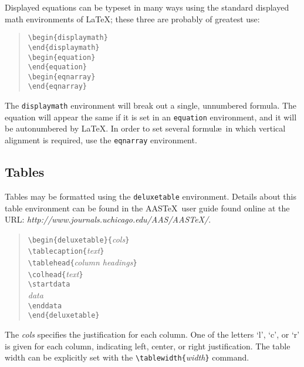 \documentclass[11pt,twoside]{article}
\def\arg#1{{\it#1\/}}
\begin{document}
Displayed equations can be typeset in many ways using the standard
displayed math environments of \LaTeX;
these three are probably of greatest use:
\begin{quote}
\verb+\begin{displaymath}+\\
\verb+\end{displaymath}+\\[.5ex]
\verb+\begin{equation}+\\
\verb+\end{equation}+\\[.5ex]
\verb+\begin{eqnarray}+\\
\verb+\end{eqnarray}+
\end{quote}
The \verb+displaymath+ environment will break out a single, unnumbered
formula.  The equation will appear the same if it is set in an
\verb+equation+ environment, and it will be autonumbered by \LaTeX.
In order to set several formul\ae\ in which vertical alignment is
required, use the \verb+eqnarray+ environment.

\subsection{Tables}

Tables may be formatted using the \verb+deluxetable+ environment.  Details
about this table environment can be found in the AAS\TeX\ user guide
found online at the URL: {\it http://www.journals.uchicago.edu/AAS/AASTeX/}. 

\begin{quote}
\verb+\begin{deluxetable}{+\arg{cols}\verb+}+\\
\verb+\tablecaption{+\arg{text}\verb+}+\\
\verb+\tablehead{+\arg{column headings}\verb+}+\\
\verb+\colhead{+\arg{text}\verb+}+\\
\verb+\startdata+\\
{\it data}\\
\verb+\enddata+\\
\verb+\end{deluxetable}+
\end{quote}

The {\it cols} specifies the justification for each column.  One of
the letters `l', `c', or `r' is given for each column, indicating left,
center, or right justification.  The table width can be explicitly set
with the \verb+\tablewidth{+\arg{width}\verb+}+ command.
\end{document}
